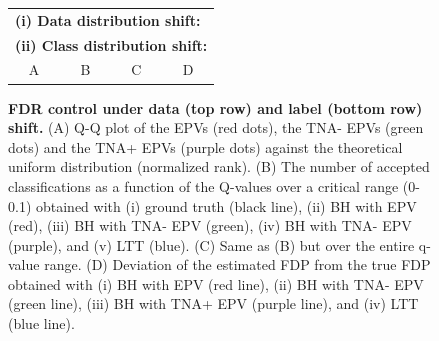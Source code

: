 \documentclass[10pt,letterpaper]{article}
\begin{document}
\begin{figure}[h!]
	\centering
	\begin{tabular}{cccc}
		\multicolumn{4}{l}{\bf (i) Data distribution shift:}\\
		\multicolumn{4}{l}{\bf (ii) Class distribution shift:}\\
		A & B & C & D \\
	\end{tabular}
\caption{{\bf  FDR control under data (top row) and label (bottom row) shift.}
	(A) Q-Q plot of the EPVs (red dots), the TNA- EPVs (green dots) and the TNA+ EPVs (purple dots) against the theoretical uniform distribution (normalized rank).
	(B) The number of accepted classifications as a function of the Q-values over a critical range (0-0.1) obtained with (i) ground truth (black line), (ii) BH with EPV (red), (iii) BH with TNA- EPV (green), (iv) BH with TNA- EPV (purple), and (v) LTT (blue).
	(C) Same as (B) but over the entire q-value range.
	(D) Deviation of the estimated FDP from the true FDP obtained with (i) BH with EPV (red line), (ii) BH with TNA- EPV  (green line),  (iii) BH with TNA+ EPV  (purple line), and (iv) LTT (blue line).}
	\label{fig:mnist_shfit}
\end{figure}

	
\end{document}
